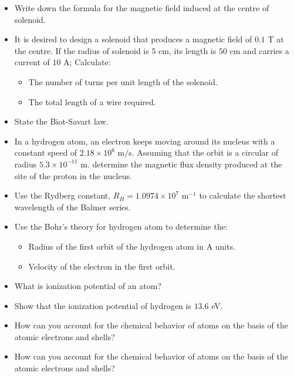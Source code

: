 \documentclass{article}
\begin{document}
\begin{itemize}
\item Write down the formula for the magnetic field induced at the centre of solenoid. 
\item It is desired to design a solenoid that produces a magnetic field of $ 0.1$ T at the centre. If the radius of solenoid is $ 5$ cm, its length is $ 50$ cm and carries a current of $ 10$ A; Calculate:
 \begin{itemize}
\item The number of turns per unit length of the solenoid. 
\item The total length of a wire required. 
\end{itemize}
\item State the Biot-Savart law. 
\item In a hydrogen atom, an electron keeps moving around its nucleus with a constant speed of $ 2.18 \times 10^{6}$ m$/$s. Assuming that the orbit is a circular of radius $ 5.3 \times 10^{-11}$ m. determine the magnetic flux density produced at the site of the proton in the nucleus. 
\item Use the Rydberg constant, $ R_{H}=1.0974 \times 10^{7}$ m$ ^{-1}$ to calculate the shortest wavelength of the Balmer series. 
\item Use the Bohr's theory for hydrogen atom to determine the:
 \begin{itemize}
\item Radius of the first orbit of the hydrogen atom in A units. 
\item Velocity of the electron in the first orbit. 
\end{itemize}
\item What is ionization potential of an atom?
\item Show that the ionization potential of hydrogen is $ 13.6$ eV. 
\item How can you account for the chemical behavior of atoms on the basis of the atomic electrons and shells? 
\item How can you account for the chemical behavior of atoms on the basis of the atomic electrons and shells? 
\end{itemize}
\end{document}
